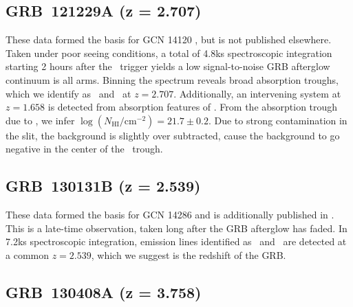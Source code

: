 \documentclass{aa}    %
\begin{document}
%

\subsection{GRB~121229A (z = 2.707)} \label{121229}

These data formed the basis for GCN 14120 \citep{GCN14120}, but is not published
elsewhere. Taken under poor seeing conditions, a total of 4.8ks spectroscopic
integration starting 2 hours after the \swift~trigger yields a low
signal-to-noise GRB afterglow continuum is all arms. Binning the spectrum
reveals broad absorption troughs, which we identify as \lyb~and \lya~at $z =
2.707$. Additionally, an intervening system at $z = 1.658$ is detected from
absorption features of \mgii. From the absorption trough due to \lya, we infer
$\log (N_{\mathrm{HI}}/\mathrm{cm}^{-2}) = 21.7 \pm 0.2$. Due to strong
contamination in the slit, the background is slightly over subtracted, cause the
background to go negative in the center of the \lya~trough.

\subsection{GRB~130131B (z = 2.539)} \label{130131}

These data formed the basis for GCN 14286 \citep{GCN14286} and is additionally
published in \citet{Kruhler2015}. This is a late-time observation, taken long
after the GRB afterglow has faded. In 7.2ks spectroscopic integration, emission
lines identified as \oii~and \oiii~are detected at a common $z = 2.539$, which
we suggest is the redshift of the GRB.

\subsection{GRB~130408A (z = 3.758)} \label{130408}
\end{document}
